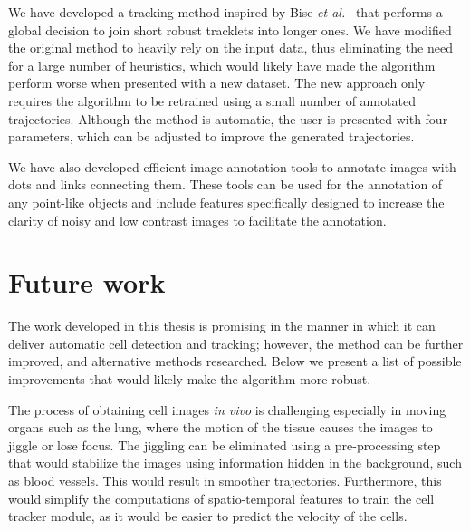 We have developed a tracking method inspired by Bise \emph{et al.}~\cite{bise11global} that performs a global decision to join short robust tracklets into longer ones. We have modified the original method to heavily rely on the input data, thus eliminating the need for a large number of heuristics, which would likely have made the algorithm perform worse when presented with a new dataset. The new approach only requires the algorithm to be retrained using a small number of annotated trajectories. Although the method is automatic, the user is presented with four parameters, which can be adjusted to improve the generated trajectories. 

We have also developed efficient image annotation tools to annotate images with dots and links connecting them. These tools can be used for the annotation of any point-like objects and include features specifically designed to increase the clarity of noisy and low contrast images to facilitate the annotation.



\section{Future work \statusfirstdraft}
\label{sec:conclusion_futurework}

The work developed in this thesis is promising in the manner in which it can deliver automatic cell detection and tracking; however, the method can be further improved, and alternative methods researched. Below we present a list of possible improvements that would likely make the algorithm more robust.

The process of obtaining cell images \textit{in vivo} is challenging especially in moving organs such as the lung, where the motion of the tissue causes the images to jiggle or lose focus. The jiggling can be eliminated using a pre-processing step that would stabilize the images using information hidden in the background, such as blood vessels. This would result in smoother trajectories. Furthermore, this would simplify the computations of spatio-temporal features to train the cell tracker module, as it would be easier to predict the velocity of the cells.

